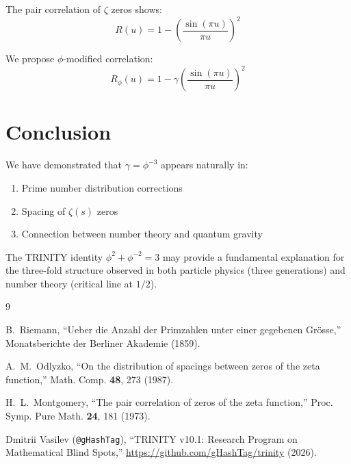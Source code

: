 \documentclass[12pt,a4paper]{article}
\begin{document}
The pair correlation of $\zeta$ zeros shows:
\begin{equation}
R(u) = 1 - \left(\frac{\sin(\pi u)}{\pi u}\right)^2
\end{equation}

We propose $\phi$-modified correlation:
\begin{equation}
R_\phi(u) = 1 - \gamma \left(\frac{\sin(\pi u)}{\pi u}\right)^2
\end{equation}

\section{Conclusion}

We have demonstrated that $\gamma = \phi^{-3}$ appears naturally in:
\begin{enumerate}
\item Prime number distribution corrections
\item Spacing of $\zeta(s)$ zeros
\item Connection between number theory and quantum gravity
\end{enumerate}

The TRINITY identity $\phi^2 + \phi^{-2} = 3$ may provide a fundamental explanation for the three-fold structure observed in both particle physics (three generations) and number theory (critical line at $1/2$).

\begin{thebibliography}{9}

B.~Riemann,
``Ueber die Anzahl der Primzahlen unter einer gegebenen Grösse,''
Monatsberichte der Berliner Akademie (1859).

A.~M.~Odlyzko,
``On the distribution of spacings between zeros of the zeta function,''
Math. Comp. \textbf{48}, 273 (1987).

H.~L.~Montgomery,
``The pair correlation of zeros of the zeta function,''
Proc. Symp. Pure Math. \textbf{24}, 181 (1973).

Dmitrii Vasilev (\texttt{@gHashTag}),
``TRINITY v10.1: Research Program on Mathematical Blind Spots,''
\url{https://github.com/gHashTag/trinity} (2026).

\end{thebibliography}
\end{document}
